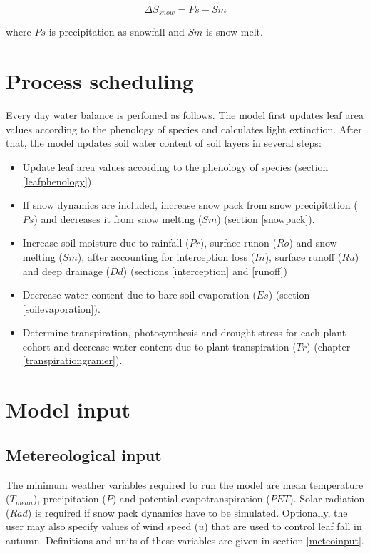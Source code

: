 \documentclass[]{book}
\providecommand{\tightlist}{%
  \setlength{\itemsep}{0pt}\setlength{\parskip}{0pt}}
\begin{document}
\begin{equation}
\Delta{S_{snow}} = Ps - Sm
\end{equation}

where \(Ps\) is precipitation as snowfall and \(Sm\) is snow melt.

\section{Process scheduling}\label{process-scheduling}

Every day water balance is perfomed as follows. The model first updates
leaf area values according to the phenology of species and calculates
light extinction. After that, the model updates soil water content of
soil layers in several steps:

\begin{itemize}
\tightlist
\item
  Update leaf area values according to the phenology of species (section
  \ref{leafphenology}).
\item
  If snow dynamics are included, increase snow pack from snow
  precipitation (\(Ps\)) and decreases it from snow melting (\(Sm\))
  (section \ref{snowpack}).
\item
  Increase soil moisture due to rainfall (\(Pr\)), surface runon
  (\(Ro\)) and snow melting (\(Sm\)), after accounting for interception
  loss (\(In\)), surface runoff (\(Ru\)) and deep drainage (\(Dd\))
  (sections \ref{interception} and \ref{runoff})
\item
  Decrease water content due to bare soil evaporation (\(Es\)) (section
  \ref{soilevaporation}).
\item
  Determine transpiration, photosynthesis and drought stress for each
  plant cohort and decrease water content due to plant transpiration
  (\(Tr\)) (chapter \ref{transpirationgranier}).
\end{itemize}

\section{Model input}\label{model-input}

\subsection{Metereological input}\label{metereological-input}

The minimum weather variables required to run the model are mean
temperature (\(T_{mean}\)), precipitation (\(P\)) and potential
evapotranspiration (\(PET\)). Solar radiation (\(Rad\)) is required if
snow pack dynamics have to be simulated. Optionally, the user may also
specify values of wind speed (\(u\)) that are used to control leaf fall
in autumn. Definitions and units of these variables are given in section
\ref{meteoinput}.
\end{document}
